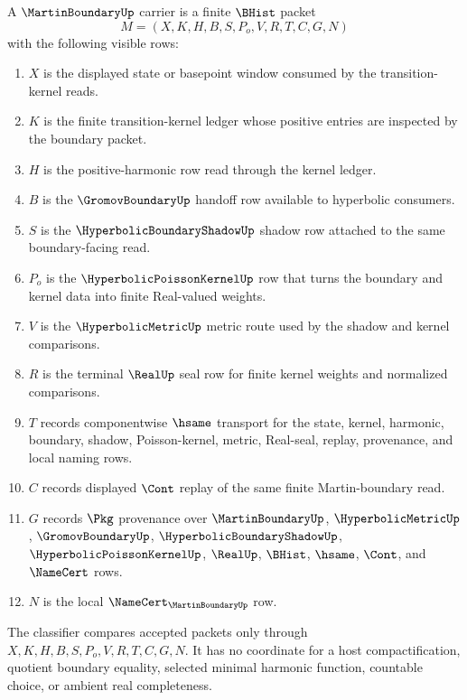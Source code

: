 \begin{definition}
\label{def:martin-boundary-carrier}
A $\MartinBoundaryUp$ carrier is a finite $\BHist$ packet
$$
M=(X,K,H,B,S,P_o,V,R,T,C,G,N)
$$
with the following visible rows:
\begin{enumerate}
\item $X$ is the displayed state or basepoint window consumed by the transition-kernel reads.
\item $K$ is the finite transition-kernel ledger whose positive entries are inspected by the boundary packet.
\item $H$ is the positive-harmonic row read through the kernel ledger.
\item $B$ is the $\GromovBoundaryUp$ handoff row available to hyperbolic consumers.
\item $S$ is the $\HyperbolicBoundaryShadowUp$ shadow row attached to the same boundary-facing read.
\item $P_o$ is the $\HyperbolicPoissonKernelUp$ row that turns the boundary and kernel data into finite Real-valued weights.
\item $V$ is the $\HyperbolicMetricUp$ metric route used by the shadow and kernel comparisons.
\item $R$ is the terminal $\RealUp$ seal row for finite kernel weights and normalized comparisons.
\item $T$ records componentwise $\hsame$ transport for the state, kernel, harmonic, boundary, shadow, Poisson-kernel, metric, Real-seal, replay, provenance, and local naming rows.
\item $C$ records displayed $\Cont$ replay of the same finite Martin-boundary read.
\item $G$ records $\Pkg$ provenance over $\MartinBoundaryUp$, $\HyperbolicMetricUp$, $\GromovBoundaryUp$, $\HyperbolicBoundaryShadowUp$, $\HyperbolicPoissonKernelUp$, $\RealUp$, $\BHist$, $\hsame$, $\Cont$, and $\NameCert$ rows.
\item $N$ is the local $\NameCert_{\MartinBoundaryUp}$ row.
\end{enumerate}
The classifier compares accepted packets only through $X,K,H,B,S,P_o,V,R,T,C,G,N$. It has no coordinate for a host compactification, quotient boundary equality, selected minimal harmonic function, countable choice, or ambient real completeness.
\end{definition}

